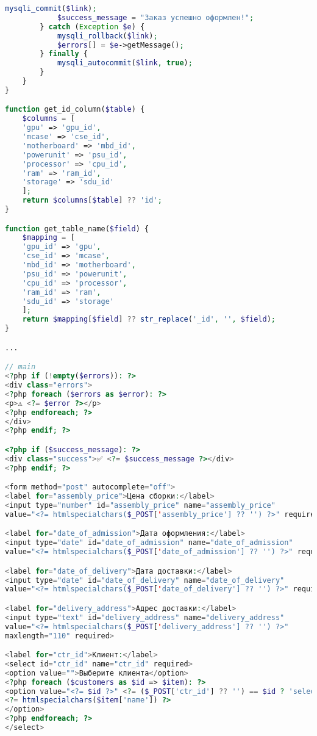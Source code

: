 \begin{lstlisting}[language=Php, frame=none]
			mysqli_commit($link);
			$success_message = "Заказ успешно оформлен!";
		} catch (Exception $e) {
			mysqli_rollback($link);
			$errors[] = $e->getMessage();
		} finally {
			mysqli_autocommit($link, true);
		}
	}
}

function get_id_column($table) {
	$columns = [
	'gpu' => 'gpu_id',
	'mcase' => 'cse_id',
	'motherboard' => 'mbd_id',
	'powerunit' => 'psu_id',
	'processor' => 'cpu_id',
	'ram' => 'ram_id',
	'storage' => 'sdu_id'
	];
	return $columns[$table] ?? 'id';
}

function get_table_name($field) {
	$mapping = [
	'gpu_id' => 'gpu',
	'cse_id' => 'mcase',
	'mbd_id' => 'motherboard',
	'psu_id' => 'powerunit',
	'cpu_id' => 'processor',
	'ram_id' => 'ram',
	'sdu_id' => 'storage'
	];
	return $mapping[$field] ?? str_replace('_id', '', $field);
}

...

// main 
<?php if (!empty($errors)): ?>
<div class="errors">
<?php foreach ($errors as $error): ?>
<p>⚠️ <?= $error ?></p>
<?php endforeach; ?>
</div>
<?php endif; ?>

<?php if ($success_message): ?>
<div class="success">✅ <?= $success_message ?></div>
<?php endif; ?>

<form method="post" autocomplete="off">
<label for="assembly_price">Цена сборки:</label>
<input type="number" id="assembly_price" name="assembly_price" 
value="<?= htmlspecialchars($_POST['assembly_price'] ?? '') ?>" required>

<label for="date_of_admission">Дата оформления:</label>
<input type="date" id="date_of_admission" name="date_of_admission"
value="<?= htmlspecialchars($_POST['date_of_admission'] ?? '') ?>" required>

<label for="date_of_delivery">Дата доставки:</label>
<input type="date" id="date_of_delivery" name="date_of_delivery" 
value="<?= htmlspecialchars($_POST['date_of_delivery'] ?? '') ?>" required>

<label for="delivery_address">Адрес доставки:</label>
<input type="text" id="delivery_address" name="delivery_address" 
value="<?= htmlspecialchars($_POST['delivery_address'] ?? '') ?>" 
maxlength="110" required>

<label for="ctr_id">Клиент:</label>
<select id="ctr_id" name="ctr_id" required>
<option value="">Выберите клиента</option>
<?php foreach ($customers as $id => $item): ?>
<option value="<?= $id ?>" <?= ($_POST['ctr_id'] ?? '') == $id ? 'selected' : '' ?>>
<?= htmlspecialchars($item['name']) ?>
</option>
<?php endforeach; ?>
</select>


\end{lstlisting}
